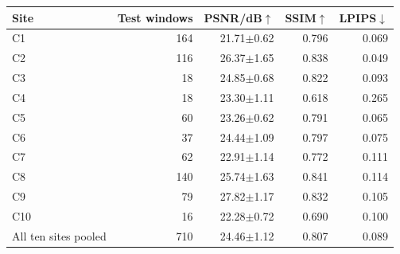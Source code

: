 \begin{tabular}{@{}lrrrr@{}}
\toprule
Site & Test windows & PSNR/dB$\uparrow$ & SSIM$\uparrow$ & LPIPS$\downarrow$\\
\midrule
C1 & 164 & 21.71$\pm$0.62 & 0.796 & 0.069 \\
C2 & 116 & 26.37$\pm$1.65 & 0.838 & 0.049 \\
C3 & 18 & 24.85$\pm$0.68 & 0.822 & 0.093 \\
C4 & 18 & 23.30$\pm$1.11 & 0.618 & 0.265 \\
C5 & 60 & 23.26$\pm$0.62 & 0.791 & 0.065 \\
C6 & 37 & 24.44$\pm$1.09 & 0.797 & 0.075 \\
C7 & 62 & 22.91$\pm$1.14 & 0.772 & 0.111 \\
C8 & 140 & 25.74$\pm$1.63 & 0.841 & 0.114 \\
C9 & 79 & 27.82$\pm$1.17 & 0.832 & 0.105 \\
C10 & 16 & 22.28$\pm$0.72 & 0.690 & 0.100 \\
\midrule
All ten sites pooled & 710 & 24.46$\pm$1.12 & 0.807 & 0.089 \\
\bottomrule
\end{tabular}
